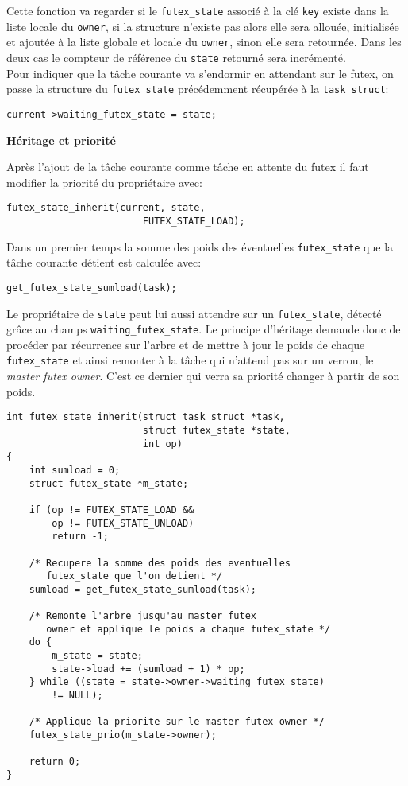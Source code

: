 Cette fonction va regarder si le \verb|futex_state| associé à la clé \verb|key| existe
dans la liste locale du \verb|owner|,
si la structure n'existe pas alors elle sera allouée, initialisée et ajoutée à la liste 
globale et locale du \verb|owner|, sinon elle sera retournée.
Dans les deux cas le compteur de référence du \verb|state| retourné sera incrémenté.
\\

Pour indiquer que la tâche courante va s'endormir en attendant sur le futex, on passe la structure
du \verb|futex_state| précédemment récupérée à la \verb|task_struct|:
\begin{lstlisting}[tabsize=4]
	current->waiting_futex_state = state;
\end{lstlisting}

\vspace{0.25cm}
\noindent \textbf{Héritage et priorité}

Après l'ajout de la tâche courante comme tâche en attente du futex il faut modifier la priorité du
propriétaire avec:
\begin{lstlisting}[tabsize=4]
	futex_state_inherit(current, state, 
						FUTEX_STATE_LOAD);
\end{lstlisting}

Dans un premier temps la somme des poids des éventuelles \verb|futex_state| que la tâche courante détient
est calculée avec:
\begin{lstlisting}[tabsize=4]
	get_futex_state_sumload(task);
\end{lstlisting}

Le propriétaire de \verb|state| peut lui aussi attendre sur un \verb|futex_state|,
détecté grâce au champs \verb|waiting_futex_state|. 
Le principe d'héritage demande donc
de procéder par récurrence sur l'arbre et de mettre à jour le poids de chaque \verb|futex_state|
et ainsi remonter à la tâche qui n'attend pas sur un verrou, le \textit{master futex owner}.
C'est ce dernier qui verra sa priorité changer à partir de son poids.

\begin{lstlisting}[tabsize=4]
int futex_state_inherit(struct task_struct *task, 
						struct futex_state *state,
						int op)
{
	int sumload = 0;
	struct futex_state *m_state;
	
	if (op != FUTEX_STATE_LOAD && 
		op != FUTEX_STATE_UNLOAD)
		return -1;
	
	/* Recupere la somme des poids des eventuelles 
 	   futex_state que l'on detient */
	sumload = get_futex_state_sumload(task);
	
	/* Remonte l'arbre jusqu'au master futex 
 	   owner et applique le poids a chaque futex_state */
	do {
		m_state = state;
		state->load += (sumload + 1) * op;
	} while ((state = state->owner->waiting_futex_state)
		!= NULL);
	
	/* Applique la priorite sur le master futex owner */
	futex_state_prio(m_state->owner);
	
	return 0;
}
\end{lstlisting}

